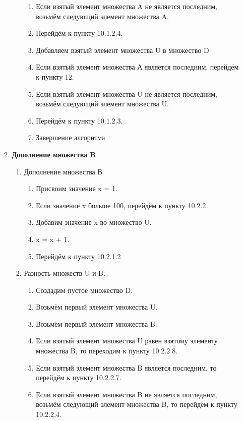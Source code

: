\documentclass[a4paper,12pt]{extarticle}
\begin{document}
\begin{enumerate}
\begin{enumerate}[label*=\arabic*.]
\begin{enumerate}[label*=\arabic*.]
\begin{enumerate}[label*=\arabic*.]
        \item Если взятый элемент множества A не является последним, возьмём следующий элемент множества A.
        \item Перейдём к пункту 10.1.2.4.
        \item Добавляем взятый элемент множества U в множество D
        \item Если взятый элемент множества А является последним, перейдём к пункту 12.
        \item Если взятый элемент множества U не является последним, возьмём следующий элемент множества U.
        \item Перейдём к пункту 10.1.2.3.
        \item Завершение алгоритма
      \end{enumerate}
    \end{enumerate}
    \item \textbf{Дополнение множества B}
    \begin{enumerate}[label*=\arabic*.]
      \item Дополнение множества В
        \begin{enumerate}[label*=\arabic*.]
          \item Присвоим значение x = 1.
          \item Если значение x больше 100, перейдём к пункту 10.2.2
          \item Добавим значение x во множество U.
          \item x = x + 1.
          \item Перейдём к пункту 10.2.1.2
        \end{enumerate}
      \item Разность множеств U и B.
        \begin{enumerate}[label*=\arabic*.]
          \item Создадим пустое множество D.
          \item Возьмём первый элемент множества U.
          \item Возьмём первый элемент множества B.
          \item Если взятый элемент множества U равен взятому элементу множества B, то переходим к пункту 10.2.2.8.
          \item Если взятый элемент множества B является последним, то перейдём к пункту 10.2.2.7.
          \item Если взятый элемент множества B не является последним, возьмём следующий элемент множества B, то перейдём к пункту 10.2.2.4.

\end{enumerate}
\end{enumerate}
\end{enumerate}
\end{enumerate}
\end{document}
